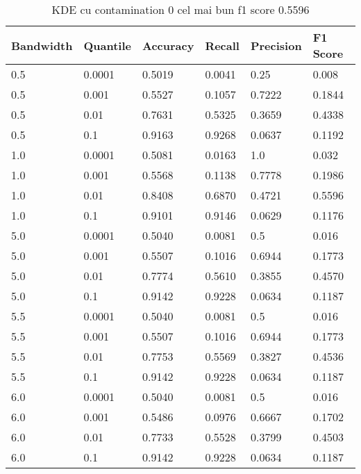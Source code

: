 \begin{table}[H]
    \caption{KDE cu contamination 0 cel mai bun f1 score 0.5596}
    \centering
    \begin{tabularx}{\textwidth}{
        |X
        |X
        |X
        |X
        |X
        |X|
    }
    \hline
    {Bandwidth} & {Quantile} & {Accuracy} & {Recall} & {Precision} & {F1 Score} \\
    \hline
    0.5 & 0.0001 & 0.5019 & 0.0041 & 0.25 & 0.008 \\
    0.5 & 0.001 & 0.5527 & 0.1057 & 0.7222 & 0.1844 \\
    0.5 & 0.01 & 0.7631 & 0.5325 & 0.3659 & 0.4338 \\
    0.5 & 0.1 & 0.9163 & 0.9268 & 0.0637 & 0.1192 \\
    1.0 & 0.0001 & 0.5081 & 0.0163 & 1.0 & 0.032 \\
    1.0 & 0.001 & 0.5568 & 0.1138 & 0.7778 & 0.1986 \\
    1.0 & 0.01 & 0.8408 & 0.6870 & 0.4721 & 0.5596 \\
    1.0 & 0.1 & 0.9101 & 0.9146 & 0.0629 & 0.1176 \\
    5.0 & 0.0001 & 0.5040 & 0.0081 & 0.5 & 0.016 \\
    5.0 & 0.001 & 0.5507 & 0.1016 & 0.6944 & 0.1773 \\
    5.0 & 0.01 & 0.7774 & 0.5610 & 0.3855 & 0.4570 \\
    5.0 & 0.1 & 0.9142 & 0.9228 & 0.0634 & 0.1187 \\
    5.5 & 0.0001 & 0.5040 & 0.0081 & 0.5 & 0.016 \\
    5.5 & 0.001 & 0.5507 & 0.1016 & 0.6944 & 0.1773 \\
    5.5 & 0.01 & 0.7753 & 0.5569 & 0.3827 & 0.4536 \\
    5.5 & 0.1 & 0.9142 & 0.9228 & 0.0634 & 0.1187 \\
    6.0 & 0.0001 & 0.5040 & 0.0081 & 0.5 & 0.016 \\
    6.0 & 0.001 & 0.5486 & 0.0976 & 0.6667 & 0.1702 \\
    6.0 & 0.01 & 0.7733 & 0.5528 & 0.3799 & 0.4503 \\
    6.0 & 0.1 & 0.9142 & 0.9228 & 0.0634 & 0.1187 \\

    \end{tabularx}
\end{table}

